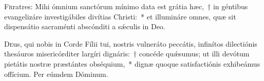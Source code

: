\documentclass[vesperale_romanum.tex]{subfiles}
\begin{document}
 
  
   
    
\capitulum \label{cap_sc}


\lettrine{F}{r}ratres: Mihi ómnium sanctórum mínimo data est grátia hæc,~† in géntibus evangelizáre investigábiles divítias Christi:~* et illumináre omnes, quæ sit dispensátio sacraménti abscónditi a sǽculis in Deo.

\hymnus \label{hy_en_ut_superba}
   
   
   \label{Tollite}
   
    \admagnificat
 \label{Ignem}
 
\oratio \label{oratio_sc}

\lettrine{D}{e}us, qui nobis in Corde Fílii tui, nostris vulneráto peccátis, infinítos dilectiónis thesáuros misericórditer largíri dignáris:~† concéde quǽsumus; ut illi devótum pietátis nostræ præstántes obséquium,~* dignæ quoque satisfactiónis exhibeámus offícium. Per eúmdem Dóminum.
 
 

\hymnusadcompletorium

 \label{ii_vesperis_sc}
\end{document}
